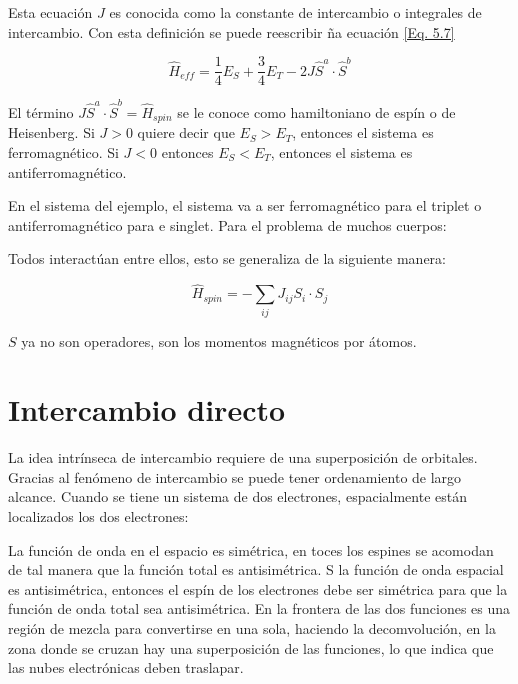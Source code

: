 \documentclass[11pt,fleqn]{book}
\begin{document}
Esta ecuación $J$ es conocida como la constante de intercambio o integrales de intercambio. Con esta definición se puede reescribir ña ecuación \ref{Eq. 5.7}

\begin{equation}
    \hat{H}_{eff}=\frac{1}{4}E_{S}+\frac{3}{4}E_{T}-2J\hat{S}^{a}\cdot\hat{S}^{b}
    \label{Eq. 5.9}
\end{equation}

El término $J\hat{S}^{a}\cdot\hat{S}^{b}=\hat{H}_{spin}$ se le conoce como hamiltoniano de espín o  de Heisenberg. Si $J>0$ quiere decir que $E_{S}>E_{T}$, entonces el sistema es ferromagnético. Si $J<0$ entonces $E_{S}<E_{T}$, entonces el sistema es antiferromagnético.




En el sistema del ejemplo, el sistema va a ser ferromagnético para el triplet o antiferromagnético para e singlet. Para el problema de muchos cuerpos:




Todos interactúan entre ellos, esto se generaliza de la siguiente manera:

\begin{equation}
    \hat{H}_{spin}=-\sum_{ij}J_{ij}S_{i}\cdot S_{j}
    \label{Eq. 5.10}
\end{equation}

$S$ ya no son operadores, son los momentos magnéticos por átomos. 

\section{Intercambio directo}

La idea intrínseca de intercambio requiere de una superposición de orbitales. Gracias al fenómeno de intercambio se puede tener ordenamiento de largo alcance. Cuando se tiene un sistema de dos electrones, espacialmente están localizados los dos electrones:


La función de onda en el espacio es simétrica, en toces los espines se acomodan de tal manera que la función total es antisimétrica. S la función de onda espacial es antisimétrica, entonces el espín de los electrones debe ser simétrica para que la función de onda total sea antisimétrica. En la frontera de las dos funciones es una región de mezcla para convertirse en una sola, haciendo la decomvolución, en la zona donde se cruzan hay una superposición de las funciones, lo que indica que  las nubes electrónicas deben traslapar. 
\end{document}
